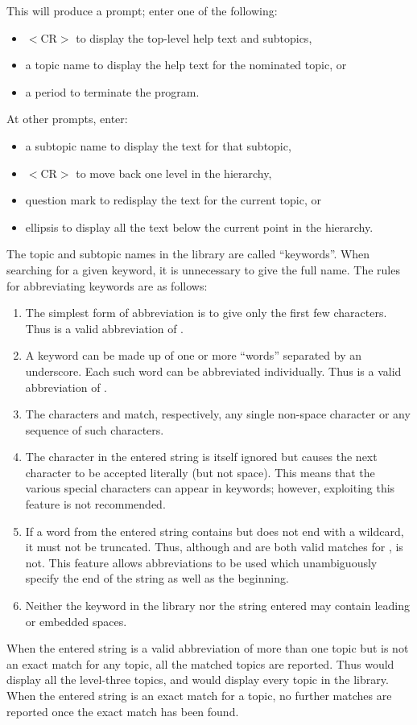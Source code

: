 This will produce a \fstring{:} prompt; enter one of the following:
\begin{itemize}
\item $<$CR$>$ to display the top-level help text and subtopics,
\item a topic name to display the help text for the nominated topic, or
\item a period to terminate the program.
\end{itemize}
At other prompts, enter:
\begin{itemize}
\item a subtopic name to display the text for that subtopic,
\item $<$CR$>$ to move back one level in the hierarchy,
\item question mark  to
redisplay the text for the current topic, or
\item ellipsis  to display all
the text below the current point in the hierarchy.
\end{itemize}
The topic and subtopic names in the library are called
``keywords''.  When searching for a given keyword, it is unnecessary to
give the full name.  The rules for abbreviating keywords are as follows:
\begin{enumerate}
\item The simplest form of abbreviation is to give only the first few
characters.  Thus  is a valid
abbreviation of .
\item A keyword can be made up of one or more ``words'' separated by an
underscore.  Each such word can be abbreviated individually.  Thus
 is a valid abbreviation of .
\item The characters \fstring{\%} and \fstring{*}
match, respectively, any single
non-space character or any sequence of such characters.
\item The character \fstring{$\backslash$}
in the entered string is itself ignored but
causes the next character to be accepted literally (but not space).
This means that the various special characters can appear in keywords;
however, exploiting this feature is not recommended.
\item If a word from the entered string contains but does not end with a
\fstring{*} wildcard, it must not be truncated.
Thus, although  and  are both valid
matches for ,  is not.
This feature allows abbreviations
to be used which unambiguously specify the end of the string as well as
the beginning.
\item Neither the keyword in the library nor the string entered may
contain leading or embedded spaces.
\end{enumerate}
When the entered string is a valid abbreviation of
more than one topic but is not an
exact match for any topic, all the matched
topics are reported.  Thus \fstring{*  *  *} would display all the level-three
topics, and  would display every topic in the library.
When the entered string is an exact match for a topic, no further
matches are reported once the exact match has been found.

